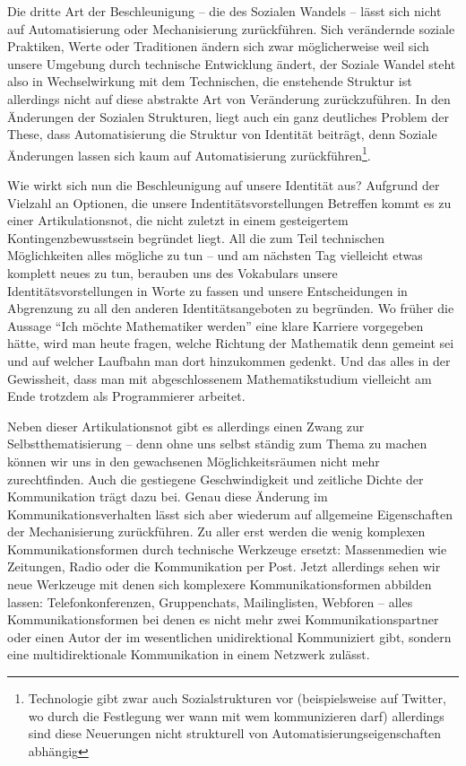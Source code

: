 Die dritte Art der Beschleunigung – die des Sozialen Wandels – lässt sich nicht auf Automatisierung oder Mechanisierung zurückführen.
Sich verändernde soziale Praktiken, Werte oder Traditionen ändern sich zwar möglicherweise weil sich unsere Umgebung durch technische Entwicklung ändert,
der Soziale Wandel steht also in Wechselwirkung mit dem Technischen\parencite{rosa1}, die enstehende Struktur ist allerdings nicht auf diese abstrakte Art von Veränderung zurückzuführen.
In den Änderungen der Sozialen Strukturen, liegt auch ein ganz deutliches Problem der These, dass Automatisierung die Struktur von Identität beiträgt, denn Soziale Änderungen lassen sich kaum auf Automatisierung zurückführen\footnote{Technologie gibt zwar auch Sozialstrukturen vor (beispielsweise auf Twitter, wo durch die Festlegung wer wann mit wem kommunizieren darf) allerdings sind diese Neuerungen nicht strukturell von Automatisierungseigenschaften abhängig}.

Wie wirkt sich nun die Beschleunigung auf unsere Identität aus? Aufgrund der Vielzahl an Optionen, die unsere Indentitätsvorstellungen Betreffen kommt es zu einer Artikulationsnot, die nicht zuletzt in einem gesteigertem Kontingenzbewusstsein begründet liegt.
All die zum Teil technischen Möglichkeiten alles mögliche zu tun – und am nächsten Tag vielleicht etwas komplett neues zu tun, berauben uns des Vokabulars unsere Identitätsvorstellungen in Worte zu fassen und unsere Entscheidungen in Abgrenzung zu all den anderen Identitätsangeboten zu begründen.
Wo früher die Aussage \enquote{Ich möchte Mathematiker werden} eine klare Karriere vorgegeben hätte, wird man heute fragen, welche Richtung der Mathematik denn gemeint sei und auf welcher Laufbahn man dort hinzukommen gedenkt.
Und das alles in der Gewissheit, dass man mit abgeschlossenem Mathematikstudium vielleicht am Ende trotzdem als Programmierer arbeitet.

Neben dieser Artikulationsnot gibt es allerdings einen Zwang zur Selbstthematisierung – denn ohne uns selbst ständig zum Thema zu machen können wir uns in den gewachsenen Möglichkeitsräumen nicht mehr zurechtfinden.
Auch die gestiegene Geschwindigkeit und zeitliche Dichte der Kommunikation trägt dazu bei.
Genau diese Änderung im Kommunikationsverhalten lässt sich aber wiederum auf allgemeine Eigenschaften der Mechanisierung zurückführen.
Zu aller erst werden die wenig komplexen Kommunikationsformen durch technische Werkzeuge ersetzt: Massenmedien wie Zeitungen, Radio oder die Kommunikation per Post. Jetzt allerdings sehen wir neue Werkzeuge mit denen sich komplexere Kommunikationsformen abbilden lassen: Telefonkonferenzen, Gruppenchats, Mailinglisten, Webforen – alles Kommunikationsformen bei denen es nicht mehr zwei Kommunikationspartner oder einen Autor der im wesentlichen unidirektional Kommuniziert gibt, sondern eine multidirektionale Kommunikation in einem Netzwerk zulässt.

